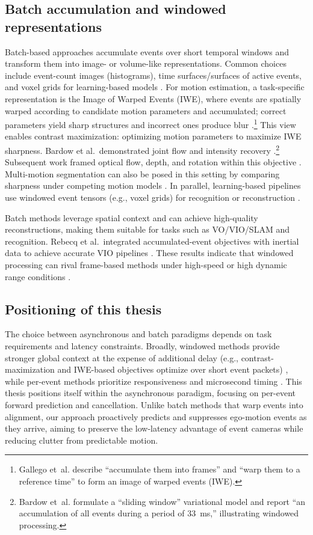 \subsection{Batch accumulation and windowed representations}
Batch-based approaches accumulate events over short temporal windows and transform them into image- or volume-like representations. Common choices include event-count images (histograms), time surfaces/surfaces of active events, and voxel grids for learning-based models \cite{Gallego2020Survey}. For motion estimation, a task-specific representation is the Image of Warped Events (IWE), where events are spatially warped according to candidate motion parameters and accumulated; correct parameters yield sharp structures and incorrect ones produce blur \cite{Gallego2018CMax}.\footnote{Gallego et~al. describe “accumulate them into frames” and “warp them to a reference time” to form an image of warped events (IWE).} This view enables contrast maximization: optimizing motion parameters to maximize IWE sharpness. Bardow et al.\ demonstrated joint flow and intensity recovery \cite{Bardow2016SOFIE}.\footnote{Bardow et~al. formulate a “sliding window” variational model and report “an accumulation of all events during a period of 33~ms,” illustrating windowed processing.} Subsequent work framed optical flow, depth, and rotation within this objective \cite{Gallego2018CMax}. Multi-motion segmentation can also be posed in this setting by comparing sharpness under competing motion models \cite{Stoffregen2019Segmentation}. In parallel, learning-based pipelines use windowed event tensors (e.g., voxel grids) for recognition or reconstruction \cite{Rebecq2019,Gallego2020Survey}.

Batch methods leverage spatial context and can achieve high-quality reconstructions, making them suitable for tasks such as VO/VIO/SLAM and recognition. Rebecq et al.\ integrated accumulated-event objectives with inertial data to achieve accurate VIO pipelines \cite{Rebecq2017,Rebecq2019}. These results indicate that windowed processing can rival frame-based methods under high-speed or high dynamic range conditions \cite{Gallego2020Survey}.

\subsection{Positioning of this thesis}
The choice between asynchronous and batch paradigms depends on task requirements and latency constraints. Broadly, windowed methods provide stronger global context at the expense of additional delay (e.g., contrast-maximization and IWE-based objectives optimize over short event packets) \cite{Gallego2018CMax,Bardow2016SOFIE,Stoffregen2019Segmentation,Rebecq2017EVO,Rebecq2019E2VID}, while per-event methods prioritize responsiveness and microsecond timing \cite{Gallego2020Survey}. This thesis positions itself within the asynchronous paradigm, focusing on per-event forward prediction and cancellation. Unlike batch methods that warp events into alignment, our approach proactively predicts and suppresses ego-motion events as they arrive, aiming to preserve the low-latency advantage of event cameras while reducing clutter from predictable motion.

